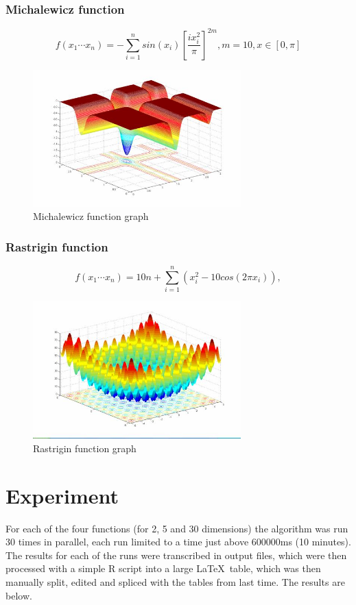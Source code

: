 \documentclass{article}
\begin{document}
	\subsubsection{Michalewicz function}
	$$f(x_1 \cdots x_n) = -{\sum_{i=1}^{n} sin(x_i)\left[\frac{ix_i^2}{\pi}\right]^{2m}}, m = 10, x \in [0, \pi]$$

	\begin{figure}[!h]
		\includegraphics[height=150pt,keepaspectratio]{images/michalewicz-graph.jpg}
		\caption{Michalewicz function graph}
	\end{figure}

	\subsubsection{Rastrigin function}
	$$f(x_1 \cdots x_n) = 10n + \sum_{i=1}^n (x_i^2 -10cos(2\pi x_i)),$$

	\begin{figure}[!h]
		\includegraphics[height=150pt,keepaspectratio]{images/rastrigin-graph.jpg}
		\caption{Rastrigin function graph}
	\end{figure}
	
	\section{Experiment}
	For each of the four functions (for 2, 5 and 30 dimensions) the algorithm was run 30 times in parallel, each run limited to a time just above 600000ms (10 minutes). The results for each of the runs were transcribed in output files, which were then processed with a simple R script into a large \LaTeX\ table, which was then manually split, edited and spliced with the tables from last time. The results are below.
\end{document}
